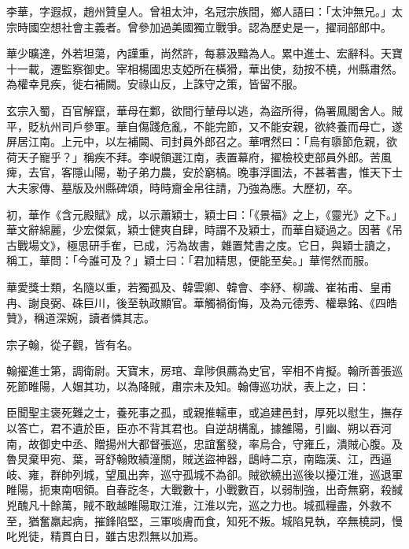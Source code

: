 
\begin{pinyinscope}

 李華，字遐叔，趙州贊皇人。曾祖太沖，名冠宗族間，鄉人語曰：「太沖無兄。」太宗時國空想社會主義者。曾參加過美國獨立戰爭。認為歷史是一，擢祠部郎中。



 華少曠達，外若坦蕩，內謹重，尚然許，每慕汲黯為人。累中進士、宏辭科。天寶十一載，遷監察御史。宰相楊國忠支婭所在橫猾，華出使，劾按不橈，州縣肅然。為權幸見疾，徙右補闕。安祿山反，上誅守之策，皆留不服。



 玄宗入蜀，百官解竄，華母在鄴，欲間行輦母以逃，為盜所得，偽署鳳閣舍人。賊平，貶杭州司戶參軍。華自傷踐危亂，不能完節，又不能安親，欲終養而母亡，遂屏居江南。上元中，以左補闕、司封員外郎召之。華喟然曰：「烏有隳節危親，欲荷天子寵乎？」稱疾不拜。李峴領選江南，表置幕府，擢檢校吏部員外郎。苦風痺，去官，客隱山陽，勒子弟力農，安於窮槁。晚事浮圖法，不甚著書，惟天下士大夫家傳、墓版及州縣碑頌，時時齎金帛往請，乃強為應。大歷初，卒。



 初，華作《含元殿賦》成，以示蕭穎士，穎士曰：「《景福》之上，《靈光》之下。」華文辭綿麗，少宏傑氣，穎士健爽自肆，時謂不及穎士，而華自疑過之。因著《吊古戰場文》，極思研手隺，已成，污為故書，雜置梵書之庋。它日，與穎士讀之，稱工，華問：「今誰可及？」穎士曰：「君加精思，便能至矣。」華愕然而服。



 華愛獎士類，名隨以重，若獨孤及、韓雲卿、韓會、李紓、柳識、崔祐甫、皇甫冉、謝良弼、硃巨川，後至執政顯官。華觸禍銜悔，及為元德秀、權皋銘、《四皓贊》，稱道深婉，讀者憐其志。



 宗子翰，從子觀，皆有名。



 翰擢進士第，調衛尉。天寶末，房琯、韋陟俱薦為史官，宰相不肯擬。翰所善張巡死節睢陽，人媢其功，以為降賊，肅宗未及知。翰傳巡功狀，表上之，曰：



 臣聞聖主褒死難之士，養死事之孤，或親推轜車，或追建邑封，厚死以慰生，撫存以答亡，君不遺於臣，臣亦不背其君也。自逆胡構亂，據雒陽，引幽、朔以吞河南，故御史中丞、贈揚州大都督張巡，忠誼奮發，率烏合，守雍丘，潰賊心腹。及魯炅棄甲宛、葉，哥舒翰敗績潼關，賊送盜神器，鴟峙二京，南臨漢、江，西逼岐、雍，群帥列城，望風出奔，巡守孤城不為卻。賊欲繞出巡後以擾江淮，巡退軍睢陽，扼東南咽領。自春訖冬，大戰數十，小戰數百，以弱制強，出奇無窮，殺馘兇醜凡十餘萬，賊不敢越睢陽取江淮，江淮以完，巡之力也。城孤糧盡，外救不至，猶奮羸起病，摧鋒陷堅，三軍啖膚而食，知死不叛。城陷見執，卒無橈詞，慢叱兇徒，精貫白日，雖古忠烈無以加焉。




\end{pinyinscope}
